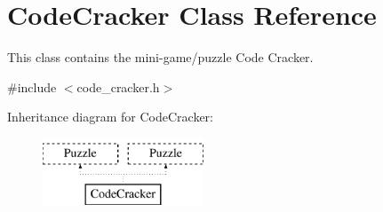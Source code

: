 \hypertarget{classCodeCracker}{\section{Code\-Cracker Class Reference}
\label{classCodeCracker}
}


This class contains the mini-\/game/puzzle Code Cracker.  




{\ttfamily \#include $<$code\-\_\-cracker.\-h$>$}

Inheritance diagram for Code\-Cracker\-:\begin{figure}[H]
\begin{center}
\leavevmode
\includegraphics[height=2.000000cm]{classCodeCracker}
\end{center}
\end{figure}
